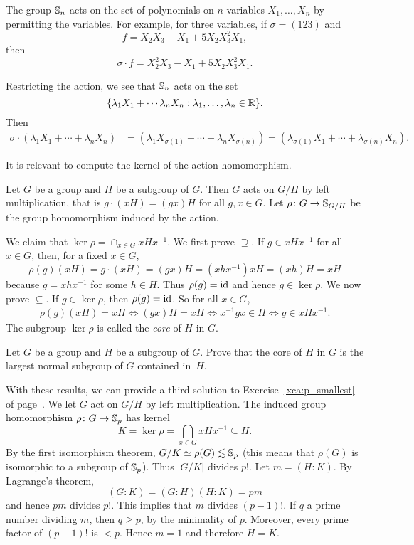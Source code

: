 \begin{example}
    The group $\mathbb{S}_n$ acts on the set of polynomials on
    $n$ variables $X_1,\dots,X_n$
    by permitting the variables. For example, for three variables, if 
    $\sigma=(123)$ and 
    \[
    f=X_2X_3-X_1+5X_2X_3^2X_1,
    \]
    then 
    \[
    \sigma\cdot f=X_2^2X_3-X_1+5X_2X_3^2X_1.
    \]

    Restricting the action, we see that 
    $\mathbb{S}_n$ acts on the set 
    \[
    \{\lambda_1X_1+\cdots\lambda_nX_n:\lambda_1,\dots,\lambda_n\in\mathbb{R}\}.
    \]
    Then 
    \begin{align*}
    \sigma \cdot (\lambda_1X_1+\cdots+\lambda_nX_n) &= (\lambda_1X_{\sigma(1)}+\cdots+\lambda_nX_{\sigma(n)})
    =(\lambda_{\sigma(1)}X_1+\cdots+\lambda_{\sigma(n)}X_n).
    \end{align*}
\end{example}

It is relevant to compute the kernel of the action homomorphism. 

\begin{example}
Let $G$ be a group and $H$ be a subgroup of $G$. Then $G$ 
acts on $G/H$ by left multiplication, that is 
$g\cdot (xH)=(gx)H$ for all $g,x\in G$. Let $\rho\colon G\to\mathbb{S}_{G/H}$ be the group homomorphism induced by the action. 

We claim that $\ker\rho=\cap_{x\in G}xHx^{-1}$. 
We first prove $\supseteq$. If $g\in xHx^{-1}$ for all 
$x\in G$, then, for a fixed $x\in G$,
 \[
 \rho(g)(xH)=g\cdot (xH)=(gx)H=(xhx^{-1})xH=(xh)H=xH
 \]
because $g=xhx^{-1}$ for some $h\in H$. Thus $\rho(g)=\operatorname{id}$ 
and hence $g\in\ker\rho$. We now prove 
$\subseteq$. If $g\in\ker\rho$, then
 $\rho(g)=\operatorname{id}$. So for all $x\in G$,
 \begin{align*}
\rho(g)(xH)=xH
\Longleftrightarrow (gx)H=xH
\Longleftrightarrow x^{-1}gx\in H
\Longleftrightarrow g\in xHx^{-1}.
 \end{align*}
The subgroup $\ker\rho$ is called the \emph{core} of $H$ in $G$. 
\end{example}

\begin{exercise}
    Let $G$ be a group and $H$ be a subgroup of $G$. Prove that
    the core 
    of $H$ in $G$ is the largest normal subgroup of $G$ 
    contained in~$H$.
\end{exercise}

With these results, we can provide a third 
solution to Exercise~\ref{xca:p_smallest} of 
page~\pageref{xca:p_smallest}.
We let  $G$ act on $G/H$ by left multiplication. 
The induced group homomorphism  $\rho\colon G\to\mathbb{S}_p$ has 
kernel 
\[
K=\ker\rho=\bigcap_{x\in G}xHx^{-1}\subseteq H.
\]
By the first isomorphism theorem, 
$G/K\simeq\rho(G)\lesssim\mathbb{S}_p$ (this means that 
$\rho(G)$ is isomorphic to a subgroup of $\mathbb{S}_p$). 
Thus $|G/K|$ divides $p!$.
Let $m=(H:K)$. By Lagrange's theorem,
\[
(G:K)=(G:H)(H:K)=pm
\]
and hence $pm$ divides $p!$. This implies that $m$ divides $(p-1)!$. If $q$ a prime number dividing 
 $m$, then $q\geq p$, by the minimality of $p$. Moreover, 
 every prime factor of $(p-1)!$ is 
 $<p$. Hence $m=1$ and therefore $H=K$.

